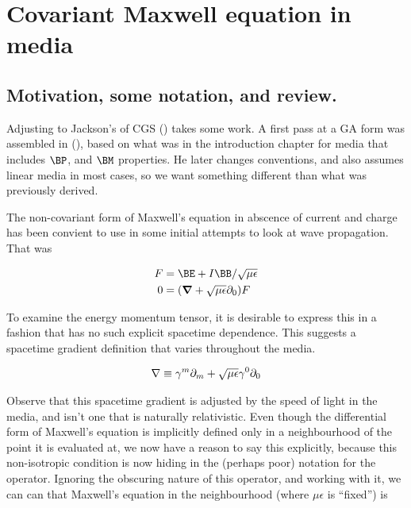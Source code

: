 

\chapter{Covariant Maxwell equation in media}
\label{chap:covariantMedia}
{}
\date{Aug 10, 2009}

\beginArtWithToc

\section{Motivation, some notation, and review.}

Adjusting to Jackson's of CGS (\cite{jackson1975cew}) takes some work.  A first pass at a GA form was assembled in (\cite{macroscopicMaxwell}), based on what was in the introduction chapter for media that includes $\BP$, and $\BM$ properties.  He later changes conventions, and also assumes linear media in most cases, so we want something different than what was previously derived.

The non-covariant form of Maxwell's equation in abscence of current and charge has been convient to use in some initial attempts to look at wave propagation.  That was

\begin{align}\label{eqn:foo1}
F &= \BE + I\BB/\sqrt{\mu\epsilon} \\
0 &= (\spacegrad + \sqrt{\mu\epsilon} \partial_0) F
\end{align}

To examine the energy momentum tensor, it is desirable to express this in a fashion that has no such explicit spacetime dependence.  This suggests a spacetime gradient definition that varies throughout the media.

\begin{align}\label{eqn:foo2}
\nabla \equiv \gamma^m \partial_m + \sqrt{\mu\epsilon} \gamma^0 \partial_0
\end{align}

Observe that this spacetime gradient is adjusted by the speed of light in the media, and isn't one that is naturally relativistic.  Even though the differential form of Maxwell's equation is implicitly defined only in a neighbourhood of the point it is evaluated at, we now have a reason to say this explicitly, because this non-isotropic condition is now hiding in the (perhaps poor) notation for the operator.  Ignoring the obscuring nature of this operator, and working with it, we can can that Maxwell's equation in the neighbourhood (where $\mu\epsilon$ is ``fixed'') is

